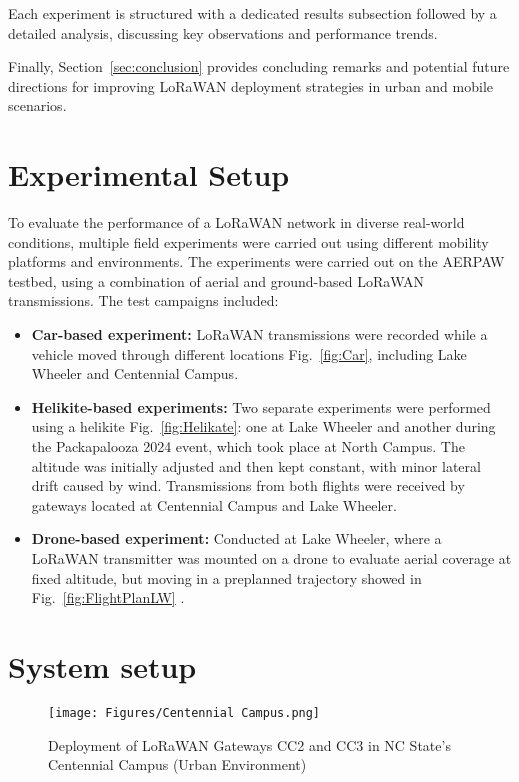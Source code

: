 \documentclass[journal]{IEEEtran}
\begin{document}
Each experiment is structured with a dedicated results subsection followed by a detailed analysis, discussing key observations and performance trends. 

Finally, Section~\ref{sec:conclusion} provides concluding remarks and potential future directions for improving LoRaWAN deployment strategies in urban and mobile scenarios.


 \section{Experimental Setup}\label{sec:experimental_setup}
To evaluate the performance of a LoRaWAN network in diverse real-world conditions, multiple field experiments were carried out using different mobility platforms and environments. The experiments were carried out on the AERPAW testbed, using a combination of aerial and ground-based LoRaWAN transmissions. The test campaigns included: 

\begin{itemize}
    \item \textbf{Car-based experiment:} LoRaWAN transmissions were recorded while a vehicle moved through different locations Fig.~\ref{fig:Car}, including Lake Wheeler and Centennial Campus.
          
    \item \textbf{Helikite-based experiments:} Two separate experiments were performed using a helikite Fig.~\ref{fig:Helikate}: one at Lake Wheeler and another during the Packapalooza 2024 event, which took place at North Campus. The altitude was initially adjusted and then kept constant, with minor lateral drift caused by wind. Transmissions from both flights were received by gateways located at Centennial Campus and Lake Wheeler.


    \item \textbf{Drone-based experiment:} Conducted at Lake Wheeler, where a LoRaWAN transmitter was mounted on a drone to evaluate aerial coverage at fixed altitude, but moving in a preplanned trajectory showed in Fig.~\ref{fig:FlightPlanLW} .

\end{itemize}


\section{System setup}\label{sec:system}


\begin{figure}[!t]
    \centering
    \texttt{[image: Figures/Centennial Campus.png]}
    \caption{Deployment of LoRaWAN Gateways CC2 and CC3 in NC State’s Centennial Campus (Urban Environment)}
    \label{fig:CC}
\end{figure}
\end{document}
